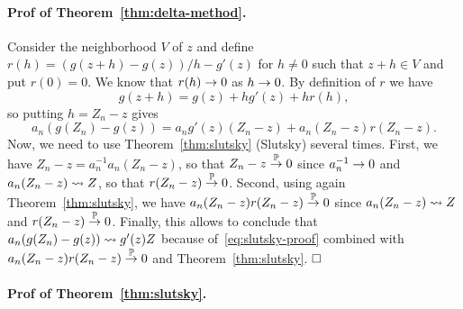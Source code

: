 \paragraph{Prof of Theorem~\ref{thm:delta-method}.} 

Consider the neighborhood $V$ of $z$ and define $r(h) = (g(z + h) - g(z)) / h - g'(z)$ for $h \neq 0$ such that $z + h \in V$ and put $r(0) = 0$. We know that $r(h) \rightarrow 0$ as $h \rightarrow 0$. By definition of $r$ we have
\begin{equation*}
	g(z + h) = g(z) + h g'(z) + h r(h),
\end{equation*}
so putting $h = Z_n - z$ gives
\begin{equation}
	\label{eq:slutsky-proof}
	a_n (g(Z_n) - g(z)) = a_n g'(z) (Z_n - z) + a_n (Z_n - z) r(Z_n - z).
\end{equation}
Now, we need to use Theorem~\ref{thm:slutsky} (Slutsky) several times. First, we have $Z_n - z = a_n^{-1} a_n (Z_n - z)$, so that $Z_n - z \overset{\mathbb P}{\rightarrow} 0$ since $a_n^{-1} \rightarrow 0$ and $a_n (Z_n - z) \leadsto Z$, so that $r(Z_n - z) \overset{\mathbb P}{\rightarrow} 0$.
Second, using again Theorem~\ref{thm:slutsky}, we have $a_n (Z_n - z) r(Z_n - z) \overset{\mathbb P}{\rightarrow} 0$ since $a_n (Z_n - z) \leadsto Z$ and $r(Z_n - z) \overset{\mathbb P}{\rightarrow} 0$. Finally, this allows to conclude that $a_n (g(Z_n) - g(z)) \leadsto g'(z) Z$ because of~\eqref{eq:slutsky-proof} combined with $a_n (Z_n - z) r(Z_n - z) \overset{\mathbb P}{\rightarrow} 0$ and Theorem~\ref{thm:slutsky}. $\hfill \square$


\paragraph{Prof of Theorem~\ref{thm:slutsky}.}

